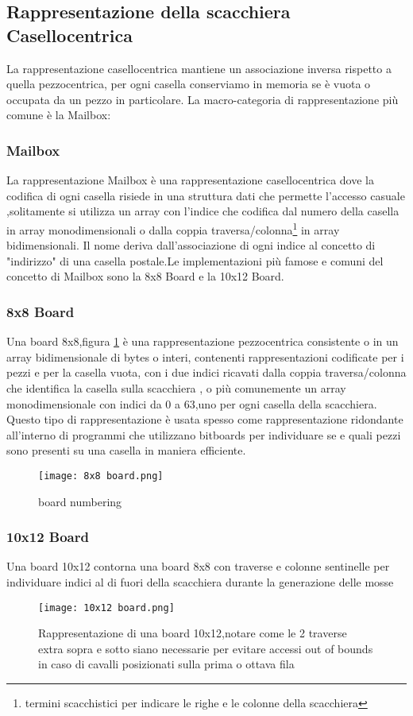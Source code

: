 \subsection{Rappresentazione della scacchiera Casellocentrica}
La rappresentazione casellocentrica  mantiene un associazione inversa rispetto a quella pezzocentrica,
per ogni casella conserviamo in memoria se è vuota o occupata da un pezzo in particolare.
La macro-categoria di  rappresentazione più comune è la Mailbox:

\subsubsection{Mailbox}
La rappresentazione Mailbox è una rappresentazione casellocentrica dove la codifica di ogni casella risiede in una struttura dati
che permette l'accesso casuale ,solitamente si utilizza un array con l'indice che codifica dal numero della casella in array monodimensionali
o dalla coppia traversa/colonna\footnote{termini scacchistici per indicare le righe e le colonne della scacchiera} in array bidimensionali.
Il nome deriva dall'associazione di ogni indice al concetto di "indirizzo" di una casella postale.Le implementazioni più famose e
comuni del concetto di Mailbox sono la 8x8 Board e la 10x12 Board.

\subsubsection{8x8 Board}
Una board 8x8,figura \ref{otto} è una rappresentazione pezzocentrica consistente o in un array bidimensionale di bytes o interi, contenenti rappresentazioni codificate
per i pezzi e per la casella vuota, con i due indici ricavati dalla coppia traversa/colonna che identifica la casella sulla scacchiera ,
o più comunemente un array monodimensionale con indici da 0 a 63,uno per ogni casella della scacchiera.
Questo tipo di rappresentazione è usata spesso come rappresentazione ridondante all'interno di programmi che utilizzano bitboards
per individuare se e quali pezzi sono presenti su una casella in maniera efficiente.
\begin{figure}[!ht]
    \centering
    \texttt{[image: 8x8 board.png]}
    \caption{board numbering}
    \label{otto}
\end{figure}

\subsubsection{10x12 Board}
Una board 10x12  contorna una  board 8x8   con traverse e colonne sentinelle  per individuare  indici al di fuori della scacchiera durante la generazione delle mosse
\vfill
\begin{figure}[!ht]
    \centering
    \texttt{[image: 10x12 board.png]}
    \caption{Rappresentazione di una board 10x12,notare come le 2 traverse extra sopra e sotto siano necessarie per evitare accessi out of bounds in caso di cavalli posizionati sulla prima o ottava fila }
\end{figure}
\vfill
\clearpage


